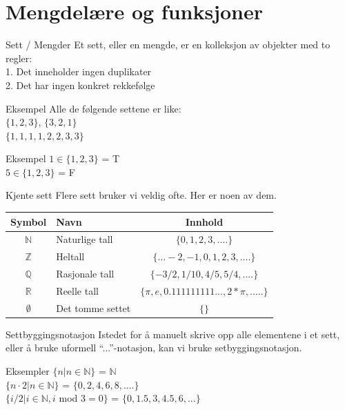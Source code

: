 \section{Mengdelære og funksjoner}
\begin{frame}{Sett / Mengder}
    Et sett, eller en mengde, er en kolleksjon av objekter med to regler:\\
    \indent \hspace{3mm}    1. Det inneholder ingen duplikater\\
    \indent \hspace{3mm}    2. Det har ingen konkret rekkefølge
    
    \pause
    \begin{block}{Eksempel}
        Alle de følgende settene er like: \\
        $\{1, 2, 3\}$, $\{3, 2, 1\}$ \\
        $\{1, 1, 1, 1, 2, 2, 3, 3\}$
    \end{block}
    
    \pause
    \begin{block}{Eksempel}
        $1 \in \{1, 2, 3\}$ = T \\
        $5 \in \{1, 2, 3\}$ = F
    \end{block}
\end{frame}


\begin{frame}{Kjente sett}
    Flere sett bruker vi veldig ofte. Her er noen av dem.\\
    
    \begin{tabular}{c|l|c}
        Symbol & Navn & Innhold \\ \hline
        $\mathbb{N}$ & Naturlige tall & $\{0, 1, 2, 3, ....\}$\\
        $\mathbb{Z}$ & Heltall & $\{... -2, -1, 0, 1, 2, 3, ....\}$\\
        $\mathbb{Q}$ & Rasjonale tall & $\{-3/2, 1/10, 4/5, 5/4, ....\}$\\
        $\mathbb{R}$ & Reelle tall & $\{\pi, e, 0.111111111..., 2*\pi, .....\}$\\
        $\emptyset$ & Det tomme settet & $\{\}$
    \end{tabular}
    
\end{frame}

\begin{frame}{Settbyggingsnotasjon}
    Istedet for å manuelt skrive opp alle elementene i et sett, eller å bruke uformell \enquote{...}-notasjon, kan vi bruke setbyggingsnotasjon.
    \begin{block}{Eksempler}
        $\{ n | n \in \mathbb{N}\}$ = $\mathbb{N}$\\
        $\{ n \cdot 2 | n \in \mathbb{N}\}$ = $\{0, 2, 4, 6, 8, ....\}$\\
        $\{ i / 2 | i \in \mathbb{N}, i$ mod $3 = 0\}$ = $\{0, 1.5, 3, 4.5, 6, ...\}$
    \end{block}
\end{frame} 

